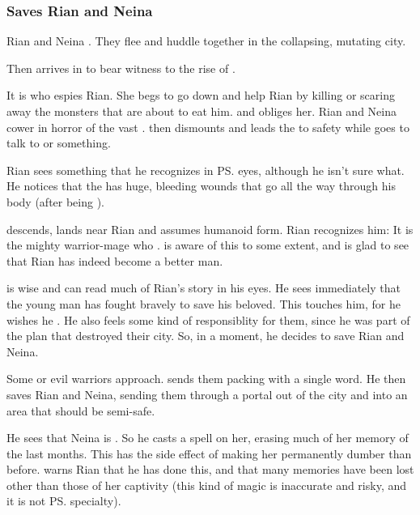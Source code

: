 \subsubsection{Saves Rian and Neina}
Rian and Neina . They flee and huddle together in the collapsing, mutating city. 

Then \Ishnaruchaefir{} arrives in \Malcur to bear witness to the rise of \Nithdornazsh. 

It is \Criseis who espies Rian.
She begs \Ishnaruchaefir to go down and help Rian by killing or scaring away the monsters that are about to eat him.
\Ishnaruchaefir {} and obliges her.
Rian and Neina cower in horror of the vast \dragon.
\Criseis then dismounts and leads the \humans to safety while \Ishnaruchaefir goes to talk to \Nzessuacrith or something.

Rian sees something that he recognizes in \ps{\Ishnaruchaefir} eyes, although he isn't sure what. 
He notices that the \dragon{} has huge, bleeding wounds that go all the way through his body (after being ). 

\Ishnaruchaefir{} descends, lands near Rian and assumes humanoid form. Rian recognizes him: It is the mighty warrior-mage who . \Ishnaruchaefir{} is aware of this to some extent, and is glad to see that Rian has indeed become a better man. 

\Ishnaruchaefir{} is wise and can read much of Rian's story in his eyes. He sees immediately that the young man has fought bravely to save his beloved. This touches him, for he wishes he . He also feels some kind of responsiblity for them, since he was part of the plan that destroyed their city. 
So, in a  moment, he decides to save Rian and Neina. 

Some \daemons{} or evil warriors approach. \Ishnaruchaefir{} sends them packing with a single word. He then saves Rian and Neina, sending them through a portal out of the city and into an area that should be semi-safe. 

He sees that Neina is . So he casts a spell on her, erasing much of her memory of the last months. This has the side effect of making her permanently dumber than before. \Ishnaruchaefir{} warns Rian that he has done this, and that many memories have been lost other than those of her captivity (this kind of magic is inaccurate and risky, and it is not \ps{\Ishnaruchaefir} specialty). 

